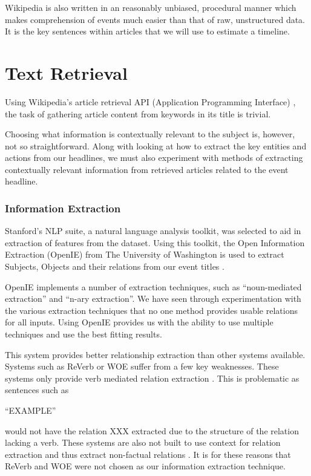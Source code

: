 \documentclass[bsc,frontabs,twoside,singlespacing,parskip,deptreport]{infthesis}     %
\begin{document}
Wikipedia is also written in an reasonably unbiased, procedural manner which makes comprehension of events much
easier than that of raw, unstructured data.
It is the key sentences within articles that we will use to estimate a timeline.

\section{Text Retrieval}
Using Wikipedia's article retrieval API (Application Programming Interface) \cite{wikipediaAPI}, the task of gathering article content
from keywords in its title is trivial.

Choosing what information is contextually relevant to the subject is, however, not so straightforward.
Along with looking at how to extract the key entities and actions from our 
headlines, we must also experiment with methods of extracting contextually relevant information from
retrieved articles related to the event headline.

\subsubsection{Information Extraction}
Stanford's NLP suite,
a natural language analysis toolkit,
was selected to aid in extraction of features from the dataset.
Using this toolkit, the Open Information Extraction (OpenIE) from
The University of Washington is used to extract Subjects, Objects
and their relations from our event titles \cite{schmitz2012open}.


OpenIE implements a number of extraction techniques, such as ``noun-mediated extraction'' and ``n-ary extraction''.
We have seen through experimentation with the various extraction techniques that no one method provides
usable relations for all inputs. Using OpenIE provides us with the ability to use multiple techniques and
use the best fitting results.

This system provides better relationship extraction than other systems available. Systems such as
ReVerb or WOE suffer from a few key weaknesses. These systems only provide verb mediated relation extraction \cite{schmitz2012open}. This is problematic as sentences such as

``EXAMPLE''

would not have the relation XXX extracted due to the structure of the relation lacking a verb.
These systems are also not built to use context for relation extraction and thus extract non-factual relations \cite{schmitz2012open}.
It is for these reasons that ReVerb and WOE were not chosen as our information extraction technique.
\end{document}

